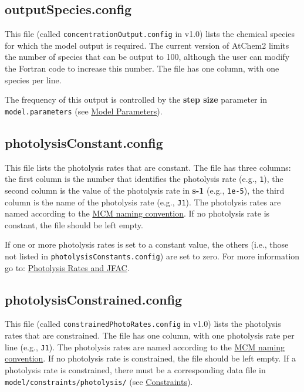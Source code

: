 \subsection{outputSpecies.config} \label{subsec:outputspecies}

This file (called \texttt{concentrationOutput.config} in v1.0) lists
the chemical species for which the model output is required. The
current version of AtChem2 limits the number of species that can be
output to 100, although the user can modify the Fortran code to
increase this number. The file has one column, with one species per
line.

The frequency of this output is controlled by the \textbf{step size}
parameter in \texttt{model.parameters} (see
\hyperref[sec:parameters]{Model Parameters}).

\subsection{photolysisConstant.config} \label{subsec:photolysisconstant}

This file lists the photolysis rates that are constant. The file has
three columns: the first column is the number that identifies the
photolysis rate (e.g., \texttt{1}), the second column is the value of
the photolysis rate in \textbf{s-1} (e.g., \texttt{1e-5}), the third
column is the name of the photolysis rate (e.g., \texttt{J1}). The
photolysis rates are named according to the
\href{http://mcm.leeds.ac.uk/MCMv3.3.1/parameters/photolysis.htt}{MCM
  naming convention}. If no photolysis rate is constant, the file
should be left empty.

If one or more photolysis rates is set to a constant value, the others
(i.e., those not listed in \texttt{photolysisConstants.config}) are
set to zero. For more information go to:
\hyperref[sec:photolysis]{Photolysis Rates and JFAC}.

\subsection{photolysisConstrained.config} \label{subsec:photolysisconstrained}

This file (called \texttt{constrainedPhotoRates.config} in v1.0) lists
the photolysis rates that are constrained. The file has one column,
with one photolysis rate per line (e.g., \texttt{J1}). The photolysis
rates are named according to the
\href{http://mcm.leeds.ac.uk/MCMv3.3.1/parameters/photolysis.htt}{MCM
  naming convention}. If no photolysis rate is constrained, the file
should be left empty. If a photolysis rate is constrained, there must
be a corresponding data file in \texttt{model/constraints/photolysis/}
(see \hyperref[sec:constraints]{Constraints}).

